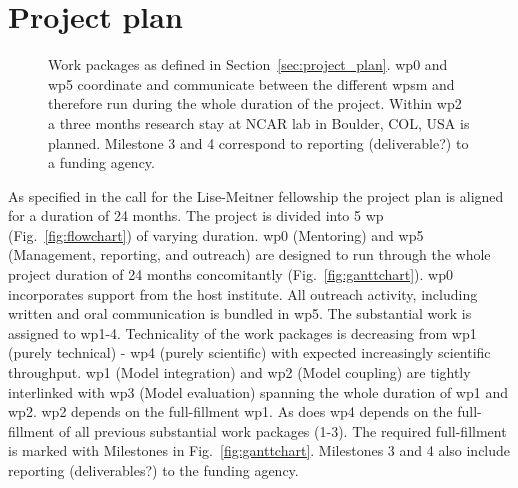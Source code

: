 \section*{Project plan}
\label{sec:project_plan}

\begin{figure}
  \centering
  \caption{Work packages as defined in Section~\ref{sec:project_plan}. \gls{wp}0 and \gls{wp}5 coordinate and communicate between the different \glspl{wp}m and therefore run during the whole duration of the project. Within \gls{wp}2 a three months research stay at NCAR lab in Boulder, COL, USA is planned. Milestone 3 and 4 correspond to reporting (deliverable?) to a funding agency.
}
\end{figure}

As specified in the call for the Lise-Meitner fellowship the project plan is aligned for a duration of 24 months. The project is divided into 5 \gls{wp} (Fig.~\ref{fig:flowchart}) of varying duration. \gls{wp}0 (Mentoring) and \gls{wp}5 (Management, reporting, and outreach) are designed to run through the whole project duration of 24 months concomitantly (Fig.~\ref{fig:ganttchart}). \gls{wp}0 incorporates support from the host institute. All outreach activity, including written and oral communication  is bundled in \gls{wp}5. The substantial work is assigned to \gls{wp}1-4. Technicality of the work packages is decreasing from \gls{wp}1 (purely technical) - \gls{wp}4 (purely scientific) with expected increasingly scientific throughput. \gls{wp}1 (Model integration) and \gls{wp}2 (Model coupling) are tightly interlinked with \gls{wp}3 (Model evaluation) spanning the whole duration of \gls{wp}1 and \gls{wp}2. \gls{wp}2 depends on the full-fillment \gls{wp}1. As does \gls{wp}4 depends on the full-fillment of all previous substantial work packages (1-3). The required full-fillment is marked with Milestones in Fig.~\ref{fig:ganttchart}. Milestones 3 and 4 also include reporting (deliverables?) to the funding agency.
 
